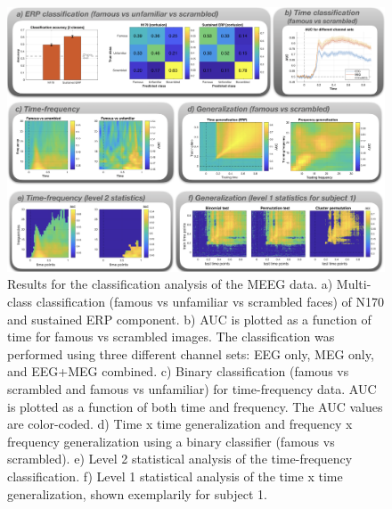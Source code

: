 \documentclass[utf8]{frontiersSCNS} %
\begin{document}
\begin{figure}[ht!]
\centering\includegraphics[width=\linewidth]{MVPA_results}
\caption{Results for the classification analysis of the \cite{Wakeman2015ADataset} MEEG data. a) Multi-class classification (famous vs unfamiliar vs scrambled faces) of N170 and sustained ERP component. b) AUC is plotted as a function of time for famous vs scrambled images. The classification was performed using three different channel sets: EEG  only, MEG only, and EEG+MEG combined. c) Binary classification (famous vs scrambled and famous vs unfamiliar) for time-frequency data. AUC is plotted as a function of both time and frequency. The AUC values are color-coded. d) Time x time generalization and frequency x frequency generalization using a binary classifier (famous vs scrambled). e) Level 2 statistical analysis of the time-frequency classification. f) Level 1 statistical analysis of the time x time generalization, shown exemplarily for subject 1. }\label{fig:results}
\end{figure}
\end{document}

